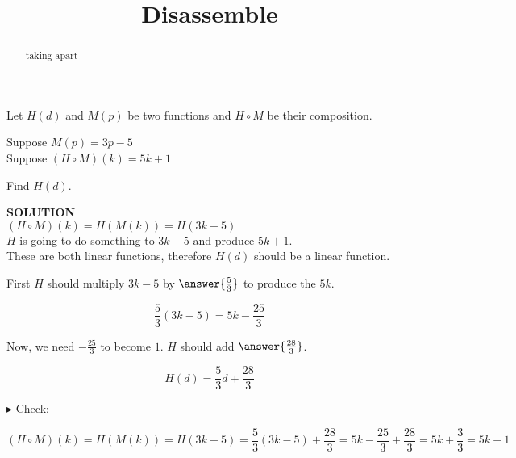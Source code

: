\documentclass{ximera}
\title{Disassemble}
\begin{document}
\begin{abstract}
taking apart
\end{abstract}
\maketitle





\begin{example}


Let $H(d)$ and $M(p)$ be two functions and $H \circ M$ be their composition.


Suppose $M(p) = 3 p - 5$ \\

Suppose $(H \circ M)(k) = 5 k + 1$


Find $H(d)$.



\textbf{\textcolor{purple!50!blue!90!black}{SOLUTION}} \\




$(H \circ M)(k) = H(M(k)) = H(3 k - 5)$  \\



$H$ is going to do something to $3 k - 5$ and produce $5 k + 1$. \\




These are both linear functions, therefore $H(d)$ should be a linear function.


First $H$ should multiply $3 k - 5$ by $\answer{\frac{5}{3}}$ to produce the $5k$.


\[    \frac{5}{3} (3 k - 5) = 5k - \frac{25}{3}   \]



Now, we need $-\frac{25}{3}$ to become $1$.  $H$ should add $\answer{\frac{28}{3}}$.

\[  H(d) =    \frac{5}{3} d +     \frac{28}{3} \]



$\blacktriangleright$ Check: 


\[    (H \circ M)(k) = H(M(k)) = H(3 k - 5) =    \frac{5}{3} (3 k - 5) +     \frac{28}{3}  = 5k - \frac{25}{3}  + \frac{28}{3}  = 5k + \frac{3}{3}  = 5k + 1\]

\end{example}
\end{document}
